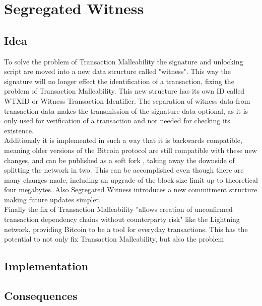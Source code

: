 \section{Segregated Witness}
\label{ch:SegWit}


\subsection{Idea}
\label{sec:SegWit:Idea}
To solve the problem of Transaction Malleability the signature and unlocking script are moved into a new data structure called "witness". This way the signature will no longer effect the identification of a transaction, fixing the problem of Transaction Malleability. This new structure has its own ID called WTXID or Witness Transaction Identifier. The separation of witness data from transaction data makes the transmission of the signature data optional, as it is only used for verification of a transaction and not needed for checking its existence. \\
Additionaly it is implemented in such a way that it is backwards compatible, meaning older versions of the Bitcoin protocol are still compatible with these new changes, and can be published as a soft fork , taking away the downside of splitting the network in two. This can be accomplished even though there are many changes made, including an upgrade of the block size limit up to theoretical four megabytes. Also Segregated Witness introduces a new commitment structure making future updates simpler. \\
Finally the fix of Transaction Malleability "allows creation of unconfirmed transaction dependency chains without counterparty risk"\cite{bip-141} like the Lightning network, providing Bitcoin to be a tool for everyday transactions. This has the potential to not only fix Transaction Malleability, but also the problem 


\subsection{Implementation}
\label{sec:SegWit:Implementation}


\subsection{Consequences}
\label{sec:SegWit:Consequences}

